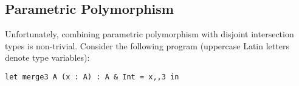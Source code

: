 \begin{comment}
\subsection{Top-like types}\bruno{You are spending too much time to
  get to the point. When writing a paper you want to get to the point
  (what's the problem) 
as fast as possible. So you should have enough background to understand
the paper, but keep that background minimal. Look at the ICFP paper: 
we got to Section 2.2 (the problem) in less than a column.
I think we don't need to
cover top-like types here. They are not essential. }
The \oldname calculus also showed how to extend the type system with a type $\top$, the supertype 
of all types.
Since introducing $\top$ leads to a useless disjointness specification (i.e. no type is disjoint to
any other type) and introduces some ambiguity because $\top \subtype \top \inter \top$ and
$\top \inter \top \subtype \top$.
Therefore, the specification was changed to the following:

\begin{definition}[$\top$-disjointness]
  Two types $A$ and $B$ are disjoint
  (written $A \disjoint B$) if the following two conditions are satisfied:
\begin{enumerate}
  \item $(\text{not}~\toplike{A})~\text{and}~(\text{not}~\toplike{B}) $
  \item $\forall C.~\text{if}~ A \subtype C~\text{and}~B \subtype C~\text{then}~\toplike{C}$
\end{enumerate}
\end{definition}
The unary relation $\toplike{\cdot}$ represents the so-called top-like types, which are types that resemble 
$\top$.
This set of types includes $\top$ itself, intersections composed of other 
top-like types (i.e. $\top \inter \top$), and pre-top-types, which are functions that have
$\top$ as their co-domain (i.e. $\tyint \to \tychar \to \top$).
\end{comment}

\subsection{Parametric Polymorphism}
Unfortunately, combining parametric polymorphism with disjoint
intersection types is non-trivial. Consider the following program
(uppercase Latin letters denote type variables):

\begin{lstlisting}
let merge3 A (x : A) : A & Int = x,,3 in
\end{lstlisting}

